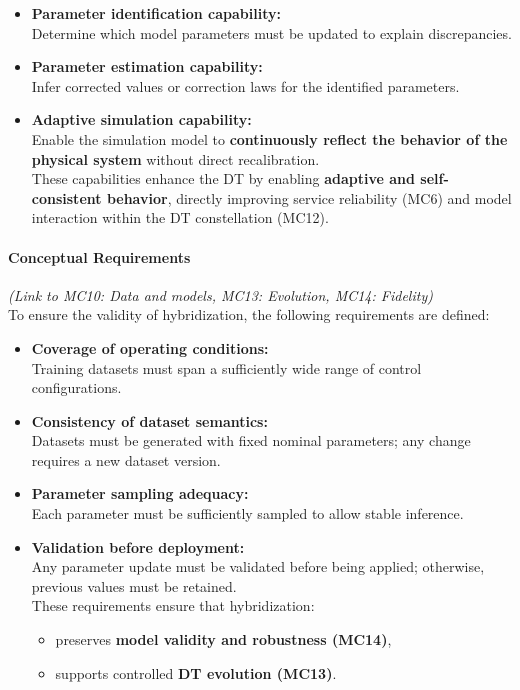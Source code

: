 \documentclass[
]{article}
\providecommand{\tightlist}{%
  \setlength{\itemsep}{0pt}\setlength{\parskip}{0pt}}
\begin{document}
\begin{itemize}
\tightlist
\item
  \textbf{Parameter identification capability:}\\
  Determine which model parameters must be updated to explain
  discrepancies.
\item
  \textbf{Parameter estimation capability:}\\
  Infer corrected values or correction laws for the identified
  parameters.
\item
  \textbf{Adaptive simulation capability:}\\
  Enable the simulation model to \textbf{continuously reflect the
  behavior of the physical system} without direct recalibration.\\
  These capabilities enhance the DT by enabling \textbf{adaptive and
  self-consistent behavior}, directly improving service reliability
  (MC6) and model interaction within the DT constellation (MC12).
\end{itemize}

\paragraph{Conceptual Requirements}\label{conceptual-requirements}

\emph{(Link to MC10: Data and models, MC13: Evolution, MC14:
Fidelity)}\\
To ensure the validity of hybridization, the following requirements are
defined:

\begin{itemize}
\tightlist
\item
  \textbf{Coverage of operating conditions:}\\
  Training datasets must span a sufficiently wide range of control
  configurations.
\item
  \textbf{Consistency of dataset semantics:}\\
  Datasets must be generated with fixed nominal parameters; any change
  requires a new dataset version.
\item
  \textbf{Parameter sampling adequacy:}\\
  Each parameter must be sufficiently sampled to allow stable inference.
\item
  \textbf{Validation before deployment:}\\
  Any parameter update must be validated before being applied;
  otherwise, previous values must be retained.\\
  These requirements ensure that hybridization:

  \begin{itemize}
  \tightlist
  \item
    preserves \textbf{model validity and robustness (MC14)},
  \item
    supports controlled \textbf{DT evolution (MC13)}.
  \end{itemize}
\end{itemize}
\end{document}
